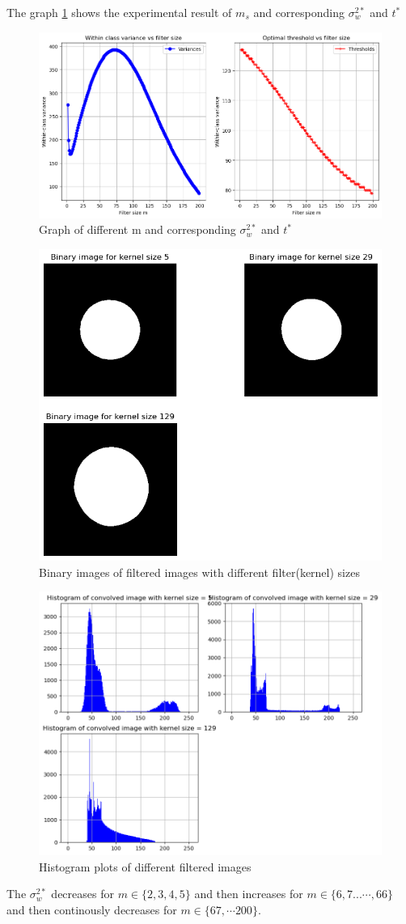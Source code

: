 \documentclass[12pt]{article}
\begin{document}
The graph \cref{fig:exp} shows the experimental result of $m_s$ and corresponding $\sigma_w^{2*} $ and $t^*$ 
\begin{figure}[b]
    \centering
    \includegraphics[width=1\linewidth]{exp.png}
    \caption{Graph of different m and corresponding $\sigma_w^{2*} $ and $t^*$ }
    \label{fig:exp}
\end{figure}

\clearpage
\begin{figure}[t]
    \centering
    \includegraphics[width=0.5\linewidth]{bin_image.png}
    \caption{Binary images of filtered images with different filter(kernel) sizes}
    \label{bin_img}
\end{figure}
\begin{figure}[h]
    \centering
    \includegraphics[width=0.6\linewidth]{hist.png}
    \caption{Histogram plots of different filtered images}
    \label{histograms}
\end{figure}
\noindent
The $\sigma_w^{2*} $ decreases for $m \in \{2,3,4,5\}$ and then increases for $m \in \{6,7...\cdots, 66\}$ and then continously decreases for $m \in \{67, \cdots 200\}$. 
\end{document}
